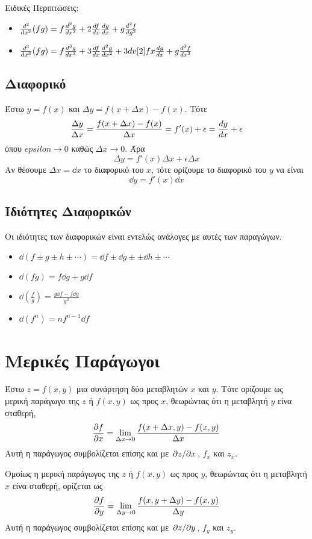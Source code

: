 Ειδικές Περιπτώσεις:
\begin{itemize}
  \item $\dv[2]{x}(fg) = f\dv[2]{g}{x} + 2\dv{f}{x}\dv{g}{x} + g\dv[2]{f}{g}$
  \item $\dv[3]{x}(fg) = f\dv[3]{g}{x} + 3\dv{f}{x}\dv[2]{g}{x} + 3dv[2]{f}{x}\dv{g}{x} + g\dv[3]{f}{x}$
\end{itemize}


\subsection{Διαφορικό}

Έστω $y=f(x)$ και $\Delta y = f(x+\Delta x) - f(x)$. Τότε
\[
  \frac{\Delta y}{\Delta x} = \frac{f(x+\Delta x) - f(x)}{\Delta x} = f'(x)+\epsilon = \dv{y}{x} + \epsilon
\]
όπου $epsilon \to 0$ καθώς $\Delta x \to 0$. Άρα
\[
  \Delta y = f'(x)\Delta x + \epsilon \Delta x
\]
Αν θέσουμε $\Delta x = \dd{x}$ το διαφορικό του $x$, τότε ορίζουμε το διαφορικό του $y$ να είναι
\[
\dd{y} = f'(x)\dd{x}
\]

\subsection{Ιδιότητες Διαφορικών}

Οι ιδιότητες των διαφορικών είναι εντελώς ανάλογες με αυτές των παραγώγων.
\begin{itemize}
  \item $\dd{(f\pm g \pm h \pm \cdots)} = \dd{f} \pm \dd{g} \pm \pm \dd{h} \pm \cdots$
  \item $\dd{(fg)} = f\dd{g}+g\dd{f}$
  \item $\dd{(\frac{f}{g})} = \frac{g\dd{f}-f\dd{g}}{g^{2}}$
  \item $\dd{(f^{n})} = nf^{n-1}\dd{f}$
\end{itemize}


\section{Μερικές Παράγωγοι}

Έστω $z=f(x,y)$ μια συνάρτηση δύο μεταβλητών $x$ και $y$. Τότε ορίζουμε ως μερική παράγωγο της $z$ ή $f(x,y)$ ως προς $x$, θεωρώντας ότι η μεταβλητή $y$ είνα σταθερή,
\[
  \pdv{f}{x} = \lim_{\Delta x\to 0}\frac{f(x+\Delta x, y) - f(x,y)}{\Delta x}
\]
Αυτή η παράγωγος συμβολίζεται επίσης και με $\pdv*{z}{x}$, $f_{x}$ και $z_{x}$.

Ομοίως η μερική παράγωγος της $z$ ή $f(x,y)$ ως προς $y$, θεωρώντας ότι η μεταβλητή $x$ είνα σταθερή, ορίζεται ως
\[
\pdv{f}{y} = \lim_{\Delta y\to 0}\frac{f(x, y+\Delta y) - f(x,y)}{\Delta y}
\]
Αυτή η παράγωγος συμβολίζεται επίσης και με $\pdv*{z}{y}$, $f_{y}$ και $z_{y}$.

